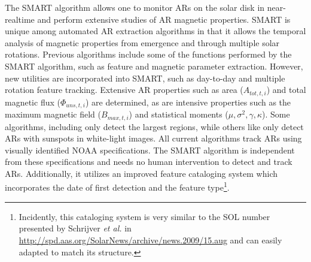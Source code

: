 The \gls{SMART} algorithm allows one to monitor \glspl{AR} on the solar disk in near-realtime and perform extensive studies of \gls{AR} magnetic properties. \gls{SMART} is unique among automated \gls{AR} extraction algorithms in that it allows the temporal analysis of magnetic properties from emergence and through multiple solar rotations. %
Previous algorithms include some of the functions performed by the
\gls{SMART} algorithm, such as feature and magnetic parameter extraction. However,  new utilities are incorporated into \gls{SMART}, such as day-to-day and multiple rotation feature tracking. Extensive \gls{AR} properties such as area ($A_{tot,t,i}$) and total magnetic flux ($\Phi_{uns,t,i}$) are determined, as are intensive properties such as the maximum magnetic field ($B_{max,t,i}$) and statistical moments ($\mu,\sigma^2,\gamma,\kappa$). Some algorithms, including \citet{LaBonte:2007} only detect the largest regions, while others like \citet{Colak:2009} only detect \glspl{AR} with sunspots in white-light images. All current algorithms track \glspl{AR} using visually identified \gls{NOAA} specifications. The \gls{SMART} algorithm is independent from these specifications and needs no human intervention to detect and track \glspl{AR}. Additionally, it utilizes an improved feature cataloging system which incorporates the date of first detection and the feature type\footnote{Incidently, this cataloging system is very similar to the SOL number presented by Schrijver \emph{et al.} in \url{http://spd.aas.org/SolarNews/archive/news.2009/15.aug} and can easily adapted to match its structure.}.


